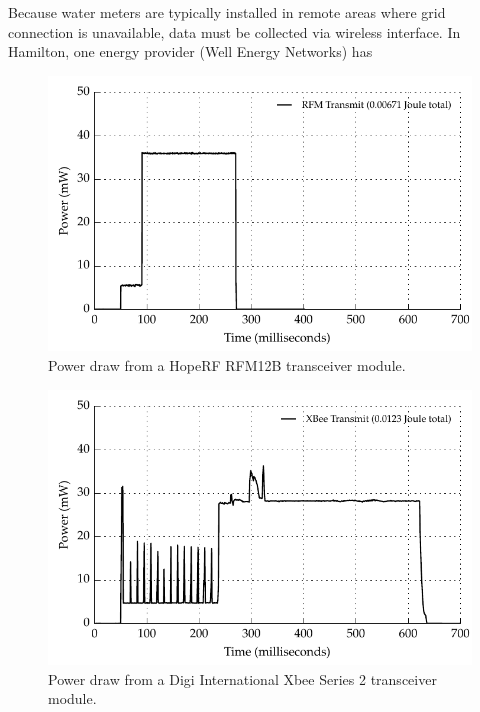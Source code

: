     Because water meters are typically installed in remote areas where grid connection is unavailable, data must be collected via wireless interface.
    In Hamilton, one energy provider (Well Energy Networks) has
    \begin{figure}
      \centering
      \includegraphics{content/pt1/03-EnergyRequirements/graphics/Graph_RFMPower.pdf}
      \caption{\label{fig:Energy-consumed-ADC}Power draw from a HopeRF RFM12B transceiver module.}
    \end{figure}

    \begin{figure}
      \centering
      \includegraphics{content/pt1/03-EnergyRequirements/graphics/Graph_XbeePower.pdf}
      \caption{\label{fig:Energy-consumed-ADC}Power draw from a Digi International Xbee Series 2 transceiver module.}
    \end{figure}